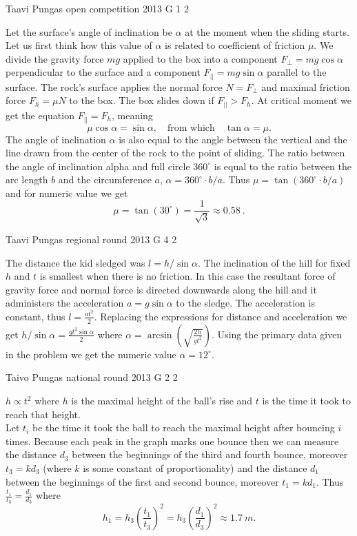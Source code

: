 \documentclass[11pt]{article}
\begin{document}
{Taavi Pungas} %
{open competition} %
{2013} %
{G 1} %
{2} %
{

\ifEngSolution
Let the surface’s angle of inclination be $\alpha$ at the moment when the sliding starts. Let us first think how this value of $\alpha$ is related to coefficient of friction $\mu$. We divide the gravity force $mg$ applied to the box into a component $F_{\bot}=mg\cos\alpha$ perpendicular to the surface and a component $F_{||}=mg\sin\alpha$ parallel to the surface. The rock’s surface applies the normal force $N=F_\bot$ and maximal friction force $F_h=\mu N$ to the box. The box slides down if $F_{||}>F_h$. At critical moment we get the equation $F_{||}=F_h$, meaning
\[ \mu \cos \alpha = \sin\alpha, \quad \text{from which} \quad \tan\alpha = \mu.\]
The angle of inclination $\alpha$ is also equal to the angle between the vertical and the line drawn from the center of the rock to the point of sliding. The ratio between the angle of inclination alpha and full circle $360^\circ$ is equal to the ratio between the arc length $b$ and the circumference $a$, $\alpha = 360^\circ \!\cdot\! b/a$. Thus $\mu = \tan (360^\circ \! \cdot\! b/a)$ and for numeric value we get 
\[\mu = \tan (30^\circ) = \frac{1}{\sqrt{3}} \approx \SI{0,58}{}.\]
\fi
}

{Taavi Pungas} %
{regional round} %
{2013} %
{G 4} %
{2} %
{

\ifEngSolution
The distance the kid sledged was $l=h / \sin \alpha$. The inclination of the hill for fixed $h$ and $t$ is smallest when there is no friction. In this case the resultant force of gravity force and normal force is directed downwards along the hill and it administers the acceleration $a=g \sin \alpha$ to the sledge. The acceleration is constant, thus $l=\frac{a t^2}{2}$. Replacing the expressions for distance and acceleration we get $h / \sin \alpha = \frac{g t^2 \sin \alpha}{2}$ where $\alpha = \arcsin( \sqrt{\frac{2h}{g t^2}})$. Using the primary data given in the problem we get the numeric value $\alpha = 12^\circ$.
\fi
}

{Taivo Pungas} %
{national round} %
{2013} %
{G 2} %
{2} %
{

\ifEngSolution
$h \propto t^{2}$ where $h$ is the maximal height of the ball’s rise and $t$ is the time it took to reach that height.\\
Let $t_{i}$ be the time it took the ball to reach the maximal height after bouncing $i$ times. Because each peak in the graph marks one bounce then we can measure the distance $d_{3}$ between the beginnings of the third and fourth bounce, moreover $t_{3}=kd_{3}$ (where $k$ is some constant of proportionality) and the distance $d_{1}$ between the beginnings of the first and second bounce, moreover $t_{1}=kd_{1}$. Thus $\frac{t_{1}}{t_{3}}=\frac{d_{1}}{d_{3}}$ where 
$$h_{1}=h_{3}(\frac{t_{1}}{t_{3}})^{2}=h_{3}(\frac{d_{1}}{d_{3}})^{2} \approx \SI{1,7}{m}.$$
\fi
}
\end{document}
